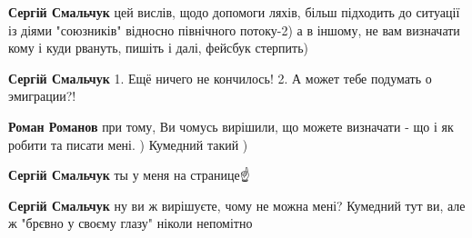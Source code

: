 \begin{itemize}
\begin{itemize}
 
\textbf{Сергій Смальчук} цей вислів, щодо допомоги ляхів, більш підходить до ситуації із діями "союзників" відносно північного потоку-2) а в іншому, не вам визначати кому і куди рвануть, пишіть і далі, фейсбук стерпить)

 
\textbf{Сергій Смальчук} 1. Ещё ничего не кончилось! 2. А может тебе подумать о эмиграции?!

 
\textbf{Роман Романов} при тому, Ви чомусь вирішили, що можете визначати - що і як робити та писати мені. ) Кумедний такий )

 
\textbf{Сергій Смальчук} ты у меня на странице☝️

 
\textbf{Сергій Смальчук} ну ви ж вирішуєте, чому не можна мені? Кумедний тут ви, але ж "брєвно у своєму глазу" ніколи непомітно

 

\end{itemize}
\end{itemize}
